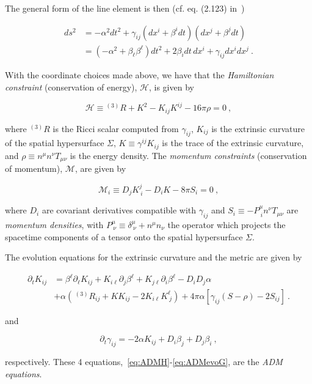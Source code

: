 \documentclass[a4paper,11pt]{article}
\renewcommand{\a}{\alpha}
\renewcommand{\b}{\beta}
\renewcommand{\d}{\delta}
\newcommand{\g}{\gamma}
\newcommand{\gDD}[2]{\g_{{#1}{#2}}}
\newcommand{\gUU}[2]{\g^{{#1}{#2}}}
\newcommand{\pd}{\partial}
\newcommand{\nn}{\nonumber}
\renewcommand{\H}{\mathcal{H}}
\newcommand{\M}{\mathcal{M}}
\newcommand{\lrpar}[1]{\left( #1 \right)}
\newcommand{\lrsquare}[1]{\left[ #1 \right]}
\newcommand{\n}{\noindent}
\newcommand{\eq}[1]{
  \begin{equation}
    #1
  \end{equation}
}
\newcommand{\al}[1]{
  \begin{align}
    #1
  \end{align}
}
\begin{document}
The general form of the line element is then (cf. eq. (2.123) in~\cite{Baumgarte:2010ndz})

\al{
  ds^{2} &= -\alpha^{2}dt^{2} + \gDD{i}{j}\lrpar{dx^{i} + \b^{i}dt}\lrpar{dx^{j} + \b^{j}dt} \nn\\
         &= \lrpar{-\a^{2} + \b_{\ell}\b^{\ell}}dt^{2} + 2\b_{i}dt\,dx^{i} + \gDD{i}{j}dx^{i}dx^{j}\ .
}

With the coordinate choices made above, we have that the \emph{Hamiltonian constraint} (conservation of energy), $\H$, is given by

\eq{ \H \equiv{} ^{(3)}\!R + K^{2} - K_{ij}K^{ij} - 16\pi\rho = 0\ ,\label{eq:ADMH} }

\n where $^{(3)}\!R$ is the Ricci scalar computed from $\gDD{i}{j}$, $K_{ij}$ is the extrinsic curvature of the spatial hypersurface $\Sigma$, $K\equiv \gUU{i}{j}K_{ij}$ is the trace of the extrinsic curvature, and $\rho\equiv n^{\mu}n^{\nu}T_{\mu\nu}$ is the energy density. The \emph{momentum constraints} (conservation of momentum), $\M$, are given by

\eq{ \M_{i} \equiv D_{j}K^{j}_{\ i} - D_{i}K - 8\pi S_{i} = 0\ ,\label{eq:ADMM} }

\noindent where $D_{i}$ are covariant derivatives compatible with $\gDD{i}{j}$ and $S_{i} \equiv - P^{\mu}_{\ i}n^{\nu}T_{\mu\nu}$ are \emph{momentum densities}, with $P^{\mu}_{\ \nu} \equiv \d^{\mu}_{\ \nu} + n^{\mu}n_{\nu}$ the operator which projects the spacetime components of a tensor onto the spatial hypersurface $\Sigma$.

The evolution equations for the extrinsic curvature and the metric are given by

\al{
  \pd_{t} K_{ij} &= \b^{\ell}\pd_{\ell}K_{ij} + K_{i\ell}\pd_{j}\b^{\ell} + K_{j\ell}\pd_{i}\b^{\ell} - D_{i}D_{j}\a\nn\\
                &+\a\lrpar{\,^{(3)}\!R_{ij} + K K_{ij} - 2K_{i\ell}K^{\ell}_{\ j}} + 4\pi\a\lrsquare{\g_{ij}\lrpar{S-\rho} -2S_{ij}}\ .\label{eq:ADMevoK}
}

\n and

\eq{ \pd_{t}\g_{ij} = -2\a K_{ij} + D_{i}\b_{j} + D_{j}\b_{i}\ ,\label{eq:ADMevoG} }

\n respectively. These 4 equations,~\eqref{eq:ADMH}-\eqref{eq:ADMevoG}, are the \emph{ADM equations}.
\end{document}
